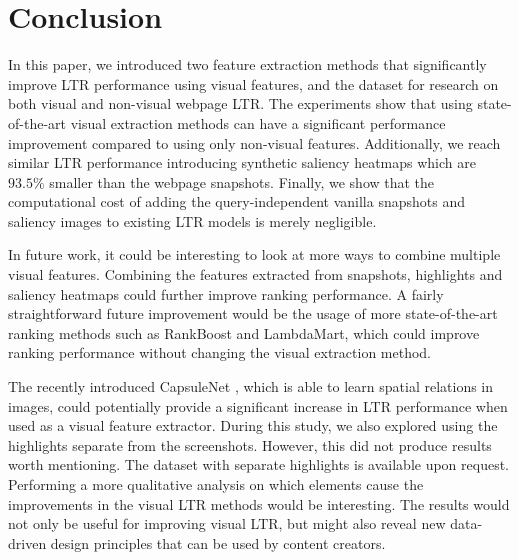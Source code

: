 
\section{Conclusion}
In this paper, we introduced two feature extraction methods that significantly improve \ac{LTR} performance using visual features, and the \datasetname{} dataset for research on both visual and non-visual webpage \ac{LTR}.
The experiments show that using state-of-the-art visual extraction methods can have a significant performance improvement compared to using only non-visual features. Additionally, we reach similar \ac{LTR} performance introducing synthetic saliency heatmaps which are $93.5\%$ smaller than the webpage snapshots. Finally, we show that the computational cost of adding the query-independent vanilla snapshots and saliency images to existing \ac{LTR} models is merely negligible.


In future work, it could be interesting to look at more ways to combine multiple visual features. Combining the features extracted from snapshots, highlights and saliency heatmaps could further improve ranking performance. 
A fairly straightforward future improvement would be the usage of more state-of-the-art ranking methods such as RankBoost and LambdaMart, which could improve ranking performance without changing the visual extraction method.

The recently introduced CapsuleNet \cite{sabour2017dynamic}, which is able to learn spatial relations in images, could potentially provide a significant increase in \ac{LTR} performance when used as a visual feature extractor.  
During this study, we also explored using the highlights separate from the screenshots. 
However, this did not produce results worth mentioning. 
The dataset with separate highlights is available upon request. 
Performing a more qualitative analysis on which elements cause the improvements in the visual \ac{LTR} methods would be interesting. 
The results would not only be useful for improving visual \ac{LTR}, but might also reveal new data-driven design principles that can be used by content creators. 